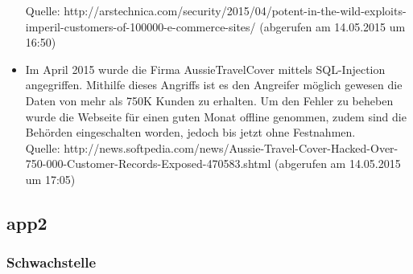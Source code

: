 \documentclass[12pt,a4paper,titlepage,oneside]{scrartcl}
\begin{document}
\begin{itemize}
Quelle: http://arstechnica.com/security/2015/04/potent-in-the-wild-exploits-imperil-customers-of-100000-e-commerce-sites/ (abgerufen am 14.05.2015 um 16:50)
\item Im April 2015 wurde die Firma AussieTravelCover mittels SQL-Injection angegriffen. Mithilfe dieses Angriffs ist es den Angreifer möglich gewesen die Daten von mehr als 750K Kunden zu erhalten. Um den Fehler zu beheben wurde die Webseite für einen guten Monat offline genommen, zudem sind die Behörden eingeschalten worden, jedoch bis jetzt ohne Festnahmen. \\
Quelle: http://news.softpedia.com/news/Aussie-Travel-Cover-Hacked-Over-750-000-Customer-Records-Exposed-470583.shtml (abgerufen am 14.05.2015 um 17:05)
\end{itemize}


\subsection{app2}

\subsubsection{Schwachstelle}
\end{document}
